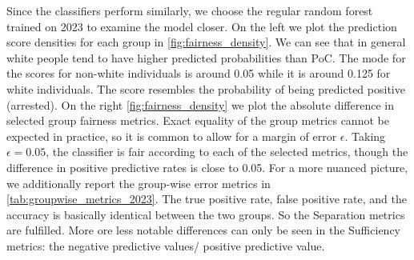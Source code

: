 Since the classifiers perform similarly, we choose the regular random forest trained on 2023 to examine the model closer.
On the left we plot the prediction score densities for each group in \autoref{fig:fairness_density}. We can see that in general white people tend to have higher predicted probabilities than PoC. The mode for the scores for non-white individuals is around 0.05 while it is around 0.125 for white individuals. The score resembles the probability of being predicted positive (arrested).
On the right \autoref{fig:fairness_density} we plot the absolute difference in selected group fairness metrics.
Exact equality of the group metrics cannot be expected in practice, so it is common to allow for a margin of error $\epsilon$. Taking $\epsilon = 0.05$, the classifier is fair according to each of the selected metrics, though the difference in positive predictive rates is close to 0.05.
For a more nuanced picture, we additionally report the group-wise error metrics in \autoref{tab:groupwise_metrics_2023}.
The true positive rate, false positive rate, and the accuracy is basically identical between the two groups. So the Separation metrics are fulfilled. More ore less notable differences can only be seen in the Sufficiency metrics: the negative predictive values/ positive predictive value.\\

